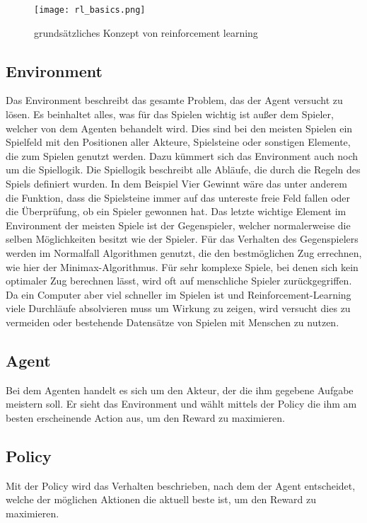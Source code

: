 \begin{figure}[h!]
  \texttt{[image: rl\_basics.png]}
  \centering
  \caption{grundsätzliches Konzept von reinforcement learning}
  \label{fig:rl_basic}
\end{figure}

\subsection{Environment}
Das Environment beschreibt das gesamte Problem, das der Agent versucht zu lösen. Es beinhaltet alles, was für das Spielen wichtig ist außer dem Spieler, welcher von dem Agenten behandelt wird.  Dies sind bei den meisten Spielen ein Spielfeld mit den Positionen aller Akteure, Spielsteine oder sonstigen Elemente, die zum Spielen genutzt werden. Dazu kümmert sich das Environment auch noch um die Spiellogik. Die Spiellogik beschreibt alle Abläufe, die durch die Regeln des Spiels definiert wurden. In dem Beispiel Vier Gewinnt wäre das unter anderem die Funktion, dass die Spielsteine immer auf das untereste freie Feld fallen oder die Überprüfung, ob ein Spieler gewonnen hat. Das letzte wichtige Element im Environment der meisten Spiele ist der Gegenspieler, welcher normalerweise die selben Möglichkeiten besitzt wie der Spieler. Für das Verhalten des Gegenspielers werden im Normalfall Algorithmen genutzt, die den bestmöglichen Zug errechnen, wie hier der Minimax-Algorithmus. Für sehr komplexe Spiele, bei denen sich kein optimaler Zug berechnen lässt, wird oft auf menschliche Spieler zurückgegriffen. Da ein Computer aber viel schneller im Spielen ist und Reinforcement-Learning viele Durchläufe absolvieren muss um Wirkung zu zeigen, wird versucht dies zu vermeiden oder bestehende Datensätze von Spielen mit Menschen zu nutzen.\\


\subsection{Agent}
Bei dem Agenten handelt es sich um den Akteur, der die ihm gegebene Aufgabe meistern soll. Er sieht das Environment und wählt mittels der Policy die ihm am besten erscheinende Action aus, um den Reward zu maximieren.\\

\subsection{Policy}
Mit der Policy wird das Verhalten beschrieben, nach dem der Agent entscheidet, welche der möglichen Aktionen die aktuell beste ist, um den Reward zu maximieren.\\

